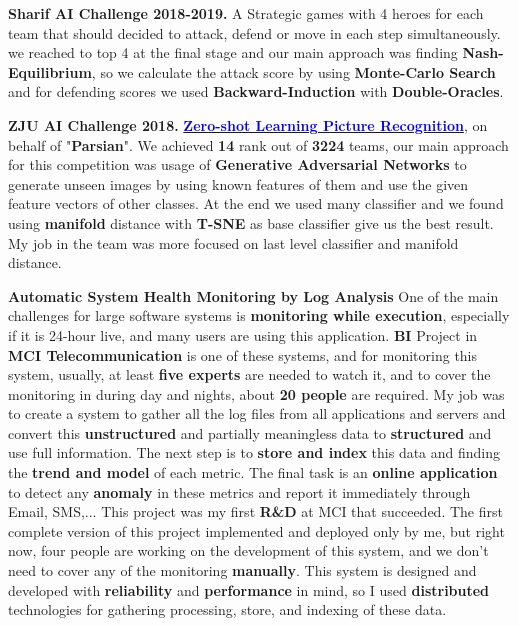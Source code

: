 \documentclass[11pt, a4paper]{awesome-cv}
\begin{document}
\begin{cvletter}
\textbf{Sharif AI Challenge 2018-2019.} \newline
A Strategic games with 4 heroes for each team that should decided to attack, defend or move in each step simultaneously. we reached to top 4 at the final stage and our main approach was finding \textbf{Nash-Equilibrium}, so we calculate the attack score by using \textbf{Monte-Carlo Search} and for defending scores we used \textbf{Backward-Induction} with \textbf{Double-Oracles}.

\textbf{ZJU AI Challenge 2018.}
\href{https://tianchi.aliyun.com/competition/rankingList.htm?spm=5176.100067.5678.4.3c934bddlu2Aga&raceId=231677}{\textcolor{blue}{\textbf{Zero-shot Learning Picture Recognition}}}, \newline
on behalf of "\textbf{Parsian}". We achieved \textbf{14} rank out of \textbf{3224} teams, our main approach for this competition was usage of \textbf{Generative Adversarial Networks} to generate unseen images by using known features of them and use the given feature vectors of other classes.
At the end we used many classifier and we found using \textbf{manifold} distance with \textbf{T-SNE} as base classifier give us the best result.
My job in the team was more focused on last level classifier and manifold distance.

\textbf{Automatic System Health Monitoring by Log Analysis} \newline
One of the main challenges for large software systems is \textbf{monitoring while execution}, especially if it is 24-hour live, and many users are using this application.
\textbf{BI} Project in \textbf{MCI Telecommunication} is one of these systems, and for monitoring this system, usually, at least \textbf{five experts} are needed to watch it, and to cover the monitoring in during day and nights, about \textbf{20 people} are required. My job was to create a system to gather all the log files from all applications and servers and convert this \textbf{unstructured} and partially meaningless data to \textbf{structured} and use full information. The next step is to \textbf{store and index} this data and finding the \textbf{trend and model} of each metric.
The final task is an \textbf{online application} to detect any \textbf{anomaly} in these metrics and report it immediately through Email, SMS,...
This project was my first \textbf{R\&D} at MCI that succeeded. The first complete version of this project implemented and deployed only by me, but right now, four people are working on the development of this system, and we don't need to cover any of the monitoring \textbf{manually}.
This system is designed and developed with \textbf{reliability} and \textbf{performance} in mind, so I used \textbf{distributed} technologies for gathering processing, store, and indexing of these data.



\end{cvletter}
\end{document}
